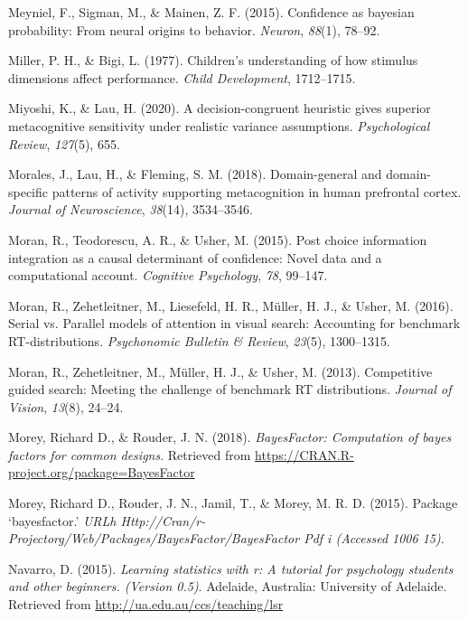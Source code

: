 \documentclass[12pt,twoside]{reedthesis}
\newenvironment{CSLReferences}%
  {}%
  {\par}
\begin{document}
\begin{CSLReferences}{1}{0}
\leavevmode\hypertarget{ref-meyniel2015confidence}{}%
Meyniel, F., Sigman, M., \& Mainen, Z. F. (2015). Confidence as bayesian probability: From neural origins to behavior. \emph{Neuron}, \emph{88}(1), 78--92.

\leavevmode\hypertarget{ref-miller1977children}{}%
Miller, P. H., \& Bigi, L. (1977). Children's understanding of how stimulus dimensions affect performance. \emph{Child Development}, 1712--1715.

\leavevmode\hypertarget{ref-miyoshi2020decision}{}%
Miyoshi, K., \& Lau, H. (2020). A decision-congruent heuristic gives superior metacognitive sensitivity under realistic variance assumptions. \emph{Psychological Review}, \emph{127}(5), 655.

\leavevmode\hypertarget{ref-morales2018domain}{}%
Morales, J., Lau, H., \& Fleming, S. M. (2018). Domain-general and domain-specific patterns of activity supporting metacognition in human prefrontal cortex. \emph{Journal of Neuroscience}, \emph{38}(14), 3534--3546.

\leavevmode\hypertarget{ref-moran2015post}{}%
Moran, R., Teodorescu, A. R., \& Usher, M. (2015). Post choice information integration as a causal determinant of confidence: Novel data and a computational account. \emph{Cognitive Psychology}, \emph{78}, 99--147.

\leavevmode\hypertarget{ref-moran2016serial}{}%
Moran, R., Zehetleitner, M., Liesefeld, H. R., Müller, H. J., \& Usher, M. (2016). Serial vs. Parallel models of attention in visual search: Accounting for benchmark RT-distributions. \emph{Psychonomic Bulletin \& Review}, \emph{23}(5), 1300--1315.

\leavevmode\hypertarget{ref-moran2013competitive}{}%
Moran, R., Zehetleitner, M., Müller, H. J., \& Usher, M. (2013). Competitive guided search: Meeting the challenge of benchmark RT distributions. \emph{Journal of Vision}, \emph{13}(8), 24--24.

\leavevmode\hypertarget{ref-R-BayesFactor}{}%
Morey, Richard D., \& Rouder, J. N. (2018). \emph{BayesFactor: Computation of bayes factors for common designs}. Retrieved from \url{https://CRAN.R-project.org/package=BayesFactor}

\leavevmode\hypertarget{ref-morey2015package}{}%
Morey, Richard D., Rouder, J. N., Jamil, T., \& Morey, M. R. D. (2015). Package {`bayesfactor.'} \emph{URLh Http://Cran/r-Projectorg/Web/Packages/BayesFactor/BayesFactor Pdf i (Accessed 1006 15)}.

\leavevmode\hypertarget{ref-R-lsr}{}%
Navarro, D. (2015). \emph{Learning statistics with r: A tutorial for psychology students and other beginners. (Version 0.5)}. Adelaide, Australia: University of Adelaide. Retrieved from \url{http://ua.edu.au/ccs/teaching/lsr}


\end{CSLReferences}
\end{document}
